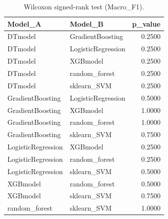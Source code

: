\begin{table}[t]
\centering
\begin{tabular}{llr}
\toprule
Model_A & Model_B & p_value \\
\midrule
DTmodel & GradientBoosting & 0.2500 \\
DTmodel & LogisticRegression & 0.2500 \\
DTmodel & XGBmodel & 0.2500 \\
DTmodel & random_forest & 0.2500 \\
DTmodel & sklearn_SVM & 0.2500 \\
GradientBoosting & LogisticRegression & 0.5000 \\
GradientBoosting & XGBmodel & 1.0000 \\
GradientBoosting & random_forest & 1.0000 \\
GradientBoosting & sklearn_SVM & 0.7500 \\
LogisticRegression & XGBmodel & 0.2500 \\
LogisticRegression & random_forest & 0.2500 \\
LogisticRegression & sklearn_SVM & 0.5000 \\
XGBmodel & random_forest & 0.5000 \\
XGBmodel & sklearn_SVM & 0.7500 \\
random_forest & sklearn_SVM & 1.0000 \\
\bottomrule
\end{tabular}
\caption{Wilcoxon signed-rank test (Macro_F1).}
\label{tab:wilcoxon_Macro_F1}
\end{table}